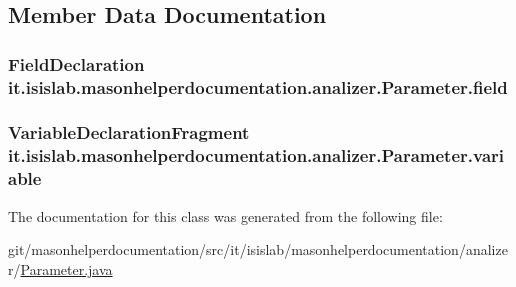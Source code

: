 \subsection{Member Data Documentation}
\hypertarget{classit_1_1isislab_1_1masonhelperdocumentation_1_1analizer_1_1_parameter_a4ef3d7c5ebfef1eaa4de0c29576511de}{
\subsubsection[{field}]{\setlength{\rightskip}{0pt plus 5cm}Field\-Declaration it.\-isislab.\-masonhelperdocumentation.\-analizer.\-Parameter.\-field\hspace{0.3cm}{\ttfamily [private]}}}\label{classit_1_1isislab_1_1masonhelperdocumentation_1_1analizer_1_1_parameter_a4ef3d7c5ebfef1eaa4de0c29576511de}
\hypertarget{classit_1_1isislab_1_1masonhelperdocumentation_1_1analizer_1_1_parameter_a34712a73715b651bb3dd284cbf1dd1c6}{
\subsubsection[{variable}]{\setlength{\rightskip}{0pt plus 5cm}Variable\-Declaration\-Fragment it.\-isislab.\-masonhelperdocumentation.\-analizer.\-Parameter.\-variable\hspace{0.3cm}{\ttfamily [private]}}}\label{classit_1_1isislab_1_1masonhelperdocumentation_1_1analizer_1_1_parameter_a34712a73715b651bb3dd284cbf1dd1c6}


The documentation for this class was generated from the following file\-:\begin{DoxyCompactItemize}
\item 
git/masonhelperdocumentation/src/it/isislab/masonhelperdocumentation/analizer/\hyperlink{_parameter_8java}{Parameter.\-java}\end{DoxyCompactItemize}
